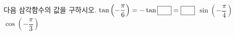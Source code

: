 다음 삼각함수의 값을 구하시오.
 $\tan\left(-\dfrac{\pi}{6}\right)=-\tan\blank[2em]=\blank[2em]$
 $\sin\left(-\dfrac{\pi}{4}\right)$
 $\cos\left(-\dfrac{\pi}{3}\right)$
